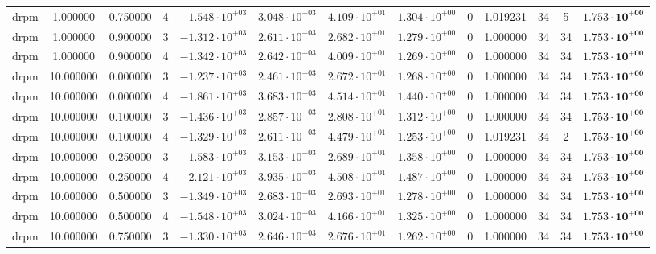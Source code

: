 \begin{table}
\begin{tabular}{ccccccccccccc}
drpm & 1.000000 & 0.750000 & 4 & $-1.548 \cdot 10^{+03}$ & $3.048 \cdot 10^{+03}$ & $4.109 \cdot 10^{+01}$ & $1.304 \cdot 10^{+00}$ & 0 & 1.019231 & 34 & 5 & $\mathbf{1.753 \cdot 10^{+00}}$ \\
drpm & 1.000000 & 0.900000 & 3 & $-1.312 \cdot 10^{+03}$ & $2.611 \cdot 10^{+03}$ & $2.682 \cdot 10^{+01}$ & $1.279 \cdot 10^{+00}$ & 0 & 1.000000 & 34 & 34 & $\mathbf{1.753 \cdot 10^{+00}}$ \\
drpm & 1.000000 & 0.900000 & 4 & $-1.342 \cdot 10^{+03}$ & $2.642 \cdot 10^{+03}$ & $4.009 \cdot 10^{+01}$ & $1.269 \cdot 10^{+00}$ & 0 & 1.000000 & 34 & 34 & $\mathbf{1.753 \cdot 10^{+00}}$ \\
drpm & 10.000000 & 0.000000 & 3 & $-1.237 \cdot 10^{+03}$ & $2.461 \cdot 10^{+03}$ & $2.672 \cdot 10^{+01}$ & $1.268 \cdot 10^{+00}$ & 0 & 1.000000 & 34 & 34 & $\mathbf{1.753 \cdot 10^{+00}}$ \\
drpm & 10.000000 & 0.000000 & 4 & $-1.861 \cdot 10^{+03}$ & $3.683 \cdot 10^{+03}$ & $4.514 \cdot 10^{+01}$ & $1.440 \cdot 10^{+00}$ & 0 & 1.000000 & 34 & 34 & $\mathbf{1.753 \cdot 10^{+00}}$ \\
drpm & 10.000000 & 0.100000 & 3 & $-1.436 \cdot 10^{+03}$ & $2.857 \cdot 10^{+03}$ & $2.808 \cdot 10^{+01}$ & $1.312 \cdot 10^{+00}$ & 0 & 1.000000 & 34 & 34 & $\mathbf{1.753 \cdot 10^{+00}}$ \\
drpm & 10.000000 & 0.100000 & 4 & $-1.329 \cdot 10^{+03}$ & $2.611 \cdot 10^{+03}$ & $4.479 \cdot 10^{+01}$ & $1.253 \cdot 10^{+00}$ & 0 & 1.019231 & 34 & 2 & $\mathbf{1.753 \cdot 10^{+00}}$ \\
drpm & 10.000000 & 0.250000 & 3 & $-1.583 \cdot 10^{+03}$ & $3.153 \cdot 10^{+03}$ & $2.689 \cdot 10^{+01}$ & $1.358 \cdot 10^{+00}$ & 0 & 1.000000 & 34 & 34 & $\mathbf{1.753 \cdot 10^{+00}}$ \\
drpm & 10.000000 & 0.250000 & 4 & $-2.121 \cdot 10^{+03}$ & $3.935 \cdot 10^{+03}$ & $4.508 \cdot 10^{+01}$ & $1.487 \cdot 10^{+00}$ & 0 & 1.000000 & 34 & 34 & $\mathbf{1.753 \cdot 10^{+00}}$ \\
drpm & 10.000000 & 0.500000 & 3 & $-1.349 \cdot 10^{+03}$ & $2.683 \cdot 10^{+03}$ & $2.693 \cdot 10^{+01}$ & $1.278 \cdot 10^{+00}$ & 0 & 1.000000 & 34 & 34 & $\mathbf{1.753 \cdot 10^{+00}}$ \\
drpm & 10.000000 & 0.500000 & 4 & $-1.548 \cdot 10^{+03}$ & $3.024 \cdot 10^{+03}$ & $4.166 \cdot 10^{+01}$ & $1.325 \cdot 10^{+00}$ & 0 & 1.000000 & 34 & 34 & $\mathbf{1.753 \cdot 10^{+00}}$ \\
drpm & 10.000000 & 0.750000 & 3 & $-1.330 \cdot 10^{+03}$ & $2.646 \cdot 10^{+03}$ & $2.676 \cdot 10^{+01}$ & $1.262 \cdot 10^{+00}$ & 0 & 1.000000 & 34 & 34 & $\mathbf{1.753 \cdot 10^{+00}}$ \\

\end{tabular}
\end{table}
